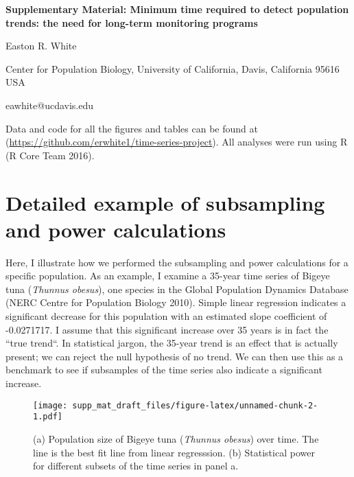 \documentclass[12pt,]{article}
\title{}
\author{}
\date{}
\begin{document}
\vspace{2cm}

\begin{center}
 \textbf{Supplementary Material: Minimum time required to detect population trends: the need for long-term monitoring programs}
 
Easton R. White
\vspace{3 mm}

Center for Population Biology, University of California, Davis, California 95616 USA

eawhite@ucdavis.edu

 \end{center}

\vspace{2cm}

\tableofcontents

\vspace{1cm}

Data and code for all the figures and tables can be found at
(\url{https://github.com/erwhite1/time-series-project}). All analyses
were run using R (R Core Team 2016).

\vspace{2cm}

\clearpage

\section{Detailed example of subsampling and power
calculations}\label{detailed-example-of-subsampling-and-power-calculations}

Here, I illustrate how we performed the subsampling and power
calculations for a specific population. As an example, I examine a
35-year time series of Bigeye tuna (\emph{Thunnus obesus}), one species
in the Global Population Dynamics Database (NERC Centre for Population
Biology 2010). Simple linear regression indicates a significant decrease
for this population with an estimated slope coefficient of -0.0271717. I
assume that this significant increase over 35 years is in fact the
``true trend``. In statistical jargon, the 35-year trend is an effect
that is actually present; we can reject the null hypothesis of no trend.
We can then use this as a benchmark to see if subsamples of the time
series also indicate a significant increase.

\begin{figure}
\centering
\texttt{[image: supp\_mat\_draft\_files/figure-latex/unnamed-chunk-2-1.pdf]}
\caption{(a) Population size of Bigeye tuna (\emph{Thunnus obesus}) over
time. The line is the best fit line from linear regresssion. (b)
Statistical power for different subsets of the time series in panel
a.\label{fig:empirical_approach_example}}
\end{figure}
\end{document}
